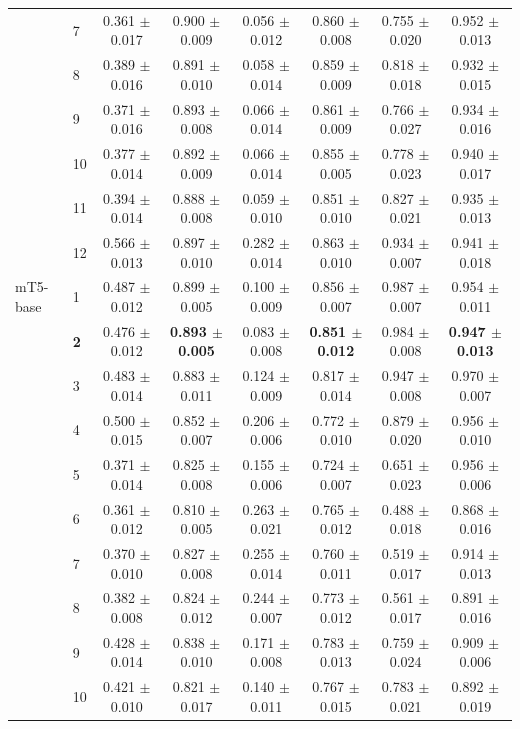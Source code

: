 \begin{longtable}{llcccccc}
 & 7 & 0.361 $\pm$ 0.017 & 0.900 $\pm$ 0.009 & 0.056 $\pm$ 0.012 & 0.860 $\pm$ 0.008 & 0.755 $\pm$ 0.020 & 0.952 $\pm$ 0.013 \\
 & 8 & 0.389 $\pm$ 0.016 & 0.891 $\pm$ 0.010 & 0.058 $\pm$ 0.014 & 0.859 $\pm$ 0.009 & 0.818 $\pm$ 0.018 & 0.932 $\pm$ 0.015 \\
 & 9 & 0.371 $\pm$ 0.016 & 0.893 $\pm$ 0.008 & 0.066 $\pm$ 0.014 & 0.861 $\pm$ 0.009 & 0.766 $\pm$ 0.027 & 0.934 $\pm$ 0.016 \\
 & 10 & 0.377 $\pm$ 0.014 & 0.892 $\pm$ 0.009 & 0.066 $\pm$ 0.014 & 0.855 $\pm$ 0.005 & 0.778 $\pm$ 0.023 & 0.940 $\pm$ 0.017 \\
 & 11 & 0.394 $\pm$ 0.014 & 0.888 $\pm$ 0.008 & 0.059 $\pm$ 0.010 & 0.851 $\pm$ 0.010 & 0.827 $\pm$ 0.021 & 0.935 $\pm$ 0.013 \\
 & 12 & 0.566 $\pm$ 0.013 & 0.897 $\pm$ 0.010 & 0.282 $\pm$ 0.014 & 0.863 $\pm$ 0.010 & 0.934 $\pm$ 0.007 & 0.941 $\pm$ 0.018 \\
\midrule
mT5-base & 1 & 0.487 $\pm$ 0.012 & 0.899 $\pm$ 0.005 & 0.100 $\pm$ 0.009 & 0.856 $\pm$ 0.007 & 0.987 $\pm$ 0.007 & 0.954 $\pm$ 0.011 \\
 & \textbf{2} & 0.476 $\pm$ 0.012 & \textbf{0.893 $\pm$ 0.005} & 0.083 $\pm$ 0.008 & \textbf{0.851 $\pm$ 0.012} & 0.984 $\pm$ 0.008 & \textbf{0.947 $\pm$ 0.013} \\
 & 3 & 0.483 $\pm$ 0.014 & 0.883 $\pm$ 0.011 & 0.124 $\pm$ 0.009 & 0.817 $\pm$ 0.014 & 0.947 $\pm$ 0.008 & 0.970 $\pm$ 0.007 \\
 & 4 & 0.500 $\pm$ 0.015 & 0.852 $\pm$ 0.007 & 0.206 $\pm$ 0.006 & 0.772 $\pm$ 0.010 & 0.879 $\pm$ 0.020 & 0.956 $\pm$ 0.010 \\
 & 5 & 0.371 $\pm$ 0.014 & 0.825 $\pm$ 0.008 & 0.155 $\pm$ 0.006 & 0.724 $\pm$ 0.007 & 0.651 $\pm$ 0.023 & 0.956 $\pm$ 0.006 \\
 & 6 & 0.361 $\pm$ 0.012 & 0.810 $\pm$ 0.005 & 0.263 $\pm$ 0.021 & 0.765 $\pm$ 0.012 & 0.488 $\pm$ 0.018 & 0.868 $\pm$ 0.016 \\
 & 7 & 0.370 $\pm$ 0.010 & 0.827 $\pm$ 0.008 & 0.255 $\pm$ 0.014 & 0.760 $\pm$ 0.011 & 0.519 $\pm$ 0.017 & 0.914 $\pm$ 0.013 \\
 & 8 & 0.382 $\pm$ 0.008 & 0.824 $\pm$ 0.012 & 0.244 $\pm$ 0.007 & 0.773 $\pm$ 0.012 & 0.561 $\pm$ 0.017 & 0.891 $\pm$ 0.016 \\
 & 9 & 0.428 $\pm$ 0.014 & 0.838 $\pm$ 0.010 & 0.171 $\pm$ 0.008 & 0.783 $\pm$ 0.013 & 0.759 $\pm$ 0.024 & 0.909 $\pm$ 0.006 \\
 & 10 & 0.421 $\pm$ 0.010 & 0.821 $\pm$ 0.017 & 0.140 $\pm$ 0.011 & 0.767 $\pm$ 0.015 & 0.783 $\pm$ 0.021 & 0.892 $\pm$ 0.019 \\

\end{longtable}
